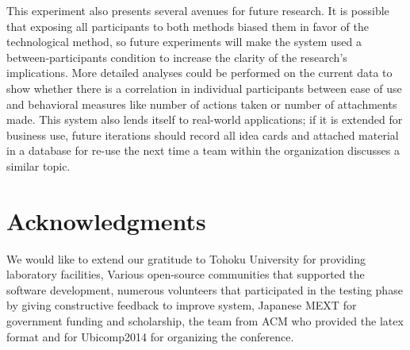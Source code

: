 \documentclass{sigchi}
\begin{document}
This experiment also presents several avenues for future research. It is possible that exposing all participants to both methods biased them in favor of the technological method, so future experiments will make the system used a between-participants condition to increase the clarity of the research's implications. More detailed analyses could be performed on the current data to show whether there is a correlation in individual participants between ease of use and behavioral measures like number of actions taken or number of attachments made. This system also lends itself to real-world applications; if it is extended for business use, future iterations should record all idea cards and attached material in a database for re-use the next time a team within the organization discusses a similar topic. 


\section{Acknowledgments}

We would like to extend our gratitude to Tohoku University for providing laboratory facilities, Various open-source communities that supported the software development, numerous volunteers that participated in the testing phase by giving constructive feedback to improve system,  Japanese MEXT for government funding and scholarship, the team from ACM who provided the latex format and for Ubicomp2014 for organizing the conference.

%
%
%
%
%



\end{document}
